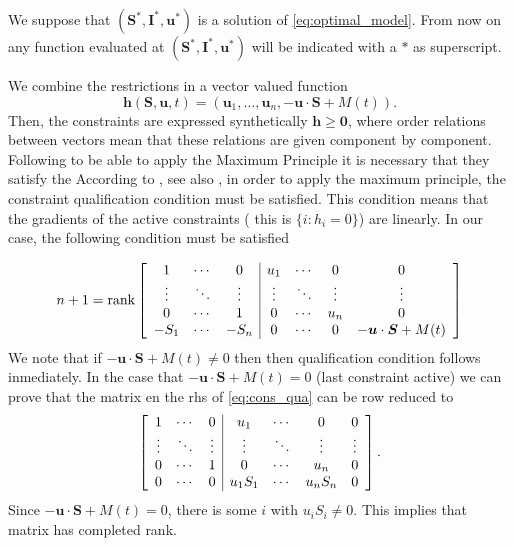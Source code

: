 \documentclass[a4paper,10pt]{article}
\theoremstyle{remark}
\newcommand{\bm}[1]{\boldsymbol{#1}}
\begin{document}
We suppose that $(\bm{S}^*,\bm{I}^{*},  \bm{u}^{*})$ is a  solution of \eqref{eq:optimal_model}. From now on any function evaluated at  $(\bm{S}^*,\bm{I}^{*},  \bm{u}^{*})$  will be indicated with a $\ast$ as superscript.

We combine the restrictions in a vector valued function 
$$\bm{h}(\bm{S},\bm{u},t)=(\bm{u}_1,\ldots, \bm{u}_n,-\bm{u}\cdot \bm{S}+M(t)).$$
Then, the constraints are expressed synthetically $\bm{h}\geq \bm{0}$, where order relations between vectors mean that these relations are given component by component. Following  to be able to apply the Maximum Principle  it is necessary that they satisfy the  
According to \cite[Th. 4.1]{A.Seierstad499}, see also \cite{hartl1995survey}, in order to apply the maximum principle, the  constraint
qualification condition must be satisfied. This condition  means that the gradients of the active constraints ( this is $ \{i :h_i=0\}$) are linearly. In our case, the following condition must be satisfied

\begin{equation}\label{eq:cons_qua}
n+1=
 \operatorname{rank}
                    \left[
                    \begin{array}{c c c|c c c c }
                      1      & \cdots & 0      & u_1    & \cdots& 0 &  0       \\
                      \vdots & \ddots & \vdots & \vdots & \ddots&\vdots & \vdots   \\
                      0      & \cdots & 1      & 0 &\cdots &  u_n   &   0      \\                                  
                      -S_1   &\cdots  & -S_n      & 0      &\cdots &0 & -\bm{u}\cdot \bm{S}+M(t)\\
                     \end{array}
                    \right]
\end{equation}
We note that if $-\bm{u}\cdot \bm{S}+M(t)\neq 0$ then then qualification condition follows inmediately. In the case that   $-\bm{u}\cdot \bm{S}+M(t)= 0$ (last constraint active) we can  prove  that  the matrix en the rhs of  \eqref{eq:cons_qua} can be row reduced to
\begin{equation*}\label{eq:cons_qua}
                    \left[
                    \begin{array}{c c c|c c c c }
                      1      & \cdots & 0      & u_1    & \cdots& 0 &  0       \\
                      \vdots & \ddots & \vdots & \vdots & \ddots&\vdots & \vdots   \\
                      0      & \cdots & 1      & 0 &\cdots &  u_n   &   0      \\                                  
                      0   &\cdots  & 0      & u_1S_1      &\cdots & u_nS_n & 0\\
                     \end{array}
                    \right].
\end{equation*}
Since $-\bm{u}\cdot \bm{S}+M(t)= 0$, there is some $i$ with $u_iS_i\neq 0$. This implies that matrix has completed rank. 
\end{document}

